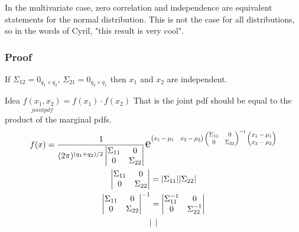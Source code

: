 In the multivariate case, zero correlation and independence are equivalent statements for the normal distribution. This is not the case for all distributions, so in the words of Cyril, "this result is very cool".

\subsubsection{Proof}
If $\Sigma_{12} = 0_{q_1 \times q_2}$, $\Sigma_{21} = 0_{q_2 \times q_1}$ then $x_1$ and $x_2$ are independent.

Idea $\underset{joint pdf}{f(x_1,x_2)}=f(x_1) \cdot f(x_2)$ That is the joint pdf should be equal to the product of the marginal pdfs.
\begin{gather*}
    f(x) = \frac{1}{(2\pi)^{(q_1+q_2)/2}
    \begin{vmatrix}
    \Sigma_{11} & 0 \\
    0 & \Sigma_{22}\\
    \end{vmatrix}} \scalebox{1.5}{e}^{
    \scalebox{0.75}{$
    \begin{pmatrix}
    x_1-\mu_1 & x_2-\mu_2
    \end{pmatrix}
    \begin{pmatrix}
    \Sigma_{11} & 0\\
    0& \Sigma_{22}
    \end{pmatrix}^{-1}
    \begin{pmatrix}
    x_1-\mu_1 \\ x_2-\mu_2
    \end{pmatrix}
    $}
    } \\
    \begin{vmatrix}
    \Sigma_{11} & 0 \\
    0 & \Sigma_{22}\\
    \end{vmatrix}= |\Sigma_{11}||\Sigma_{22}| \\
    \begin{vmatrix}
    \Sigma_{11} & 0 \\
    0 & \Sigma_{22}\\
    \end{vmatrix}^{-1}=
    \begin{vmatrix}
    \Sigma_{11}^{-1} & 0 \\
    0 & \Sigma_{22}^{-1}\\
    \end{vmatrix}\\
    \begin{vmatrix}

\end{vmatrix}
\end{gather*}
